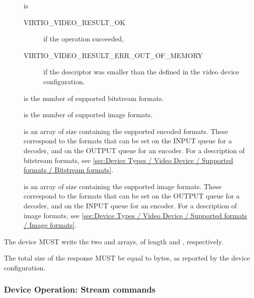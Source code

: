 \begin{description}
\item[]
is

\begin{description}
\item[VIRTIO\_VIDEO\_RESULT\_OK]
if the operation succeeded,
\item[VIRTIO\_VIDEO\_RESULT\_ERR\_OUT\_OF\_MEMORY]
if the descriptor was smaller than the defined  in
the video device configuration.
\end{description}
\item[]
is the number of supported bitstream formats.
\item[]
is the number of supported image formats.
\item[]
is an array of size  containing the
supported encoded formats. These correspond to the formats that can be
set on the INPUT queue for a decoder, and on the OUTPUT queue for an
encoder. For a description of bitstream formats, see
\ref{sec:Device Types / Video Device / Supported formats / Bitstream formats}.
\item[]
is an array of size  containing the supported
image formats. These correspond to the formats that can be set on the
OUTPUT queue for a decoder, and on the INPUT queue for an encoder. For a
description of image formats, see
\ref{sec:Device Types / Video Device / Supported formats / Image formats}.
\end{description}


The device MUST write the two  and
 arrays, of length 
and , respectively.

The total size of the response MUST be equal to 
bytes, as reported by the device configuration.

\subsubsection{Device Operation: Stream commands}\label{sec:Device Types / Video Device / Device Operation / Device Operation: Stream commands}

